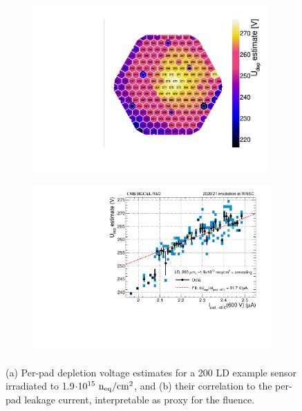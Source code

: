 \begin{figure}
	\captionsetup[subfigure]{aboveskip=-1pt,belowskip=-1pt}
	\centering
	\begin{subfigure}[b]{0.49\textwidth}
		\centering
		\includegraphics[width=0.99\textwidth]{plots/Vdep_hexplots/0541_04.pdf}
		\subcaption{
			}
			\label{plot:Vdep_hexplot_0541_04}
	\end{subfigure}
	\hfill
	\begin{subfigure}[b]{0.49\textwidth}
		\centering
		\includegraphics[width=0.999\textwidth]{plots/Vdep_vs_fluence/Vdep_vs_current_5414.pdf}
		\subcaption{
			}
			\label{plot:Vdep_vs_current_5414}
	\end{subfigure}
	\caption{
		(a) Per-pad depletion voltage estimates for a \SI{200}{\micron} LD example sensor irradiated to 1.9$\cdot 10^{15}~\mathrm{n_{eq}}/\mathrm{cm}^{2}$, and 
		(b) their correlation to the per-pad leakage current, interpretable as proxy for the fluence.
	}
\end{figure}
